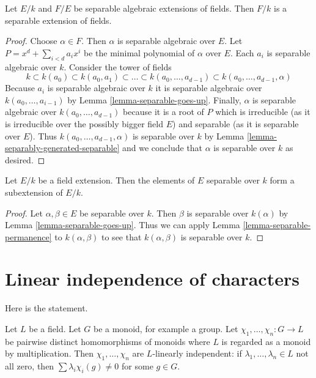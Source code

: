 \begin{lemma}
\label{lemma-separable-permanence}
Let $E/k$ and $F/E$ be separable algebraic extensions of fields. Then $F/k$
is a separable extension of fields.
\end{lemma}

\begin{proof}
Choose $\alpha \in F$. Then $\alpha$ is separable algebraic over $E$.
Let $P = x^d + \sum_{i < d} a_i x^i$ be the minimal polynomial of
$\alpha$ over $E$. Each $a_i$ is separable algebraic over $k$.
Consider the tower of fields
$$
k \subset k(a_0) \subset k(a_0, a_1) \subset \ldots \subset
k(a_0, \ldots, a_{d - 1}) \subset k(a_0, \ldots, a_{d - 1}, \alpha)
$$
Because $a_i$ is separable algebraic over $k$ it is separable algebraic
over $k(a_0, \ldots, a_{i - 1})$ by Lemma \ref{lemma-separable-goes-up}.
Finally, $\alpha$ is separable algebraic over $k(a_0, \ldots, a_{d - 1})$
because it is a root of $P$ which is irreducible
(as it is irreducible over the possibly bigger field $E$)
and separable (as it is separable over $E$).
Thus $k(a_0, \ldots, a_{d - 1}, \alpha)$ is separable over $k$
by Lemma \ref{lemma-separably-generated-separable}
and we conclude that $\alpha$ is separable over $k$ as desired.
\end{proof}

\begin{lemma}
\label{lemma-separable-elements}
Let $E/k$ be a field extension. Then the elements of $E$ separable
over $k$ form a subextension of $E/k$.
\end{lemma}

\begin{proof}
Let $\alpha, \beta \in E$ be separable over $k$. Then $\beta$ is separable
over $k(\alpha)$ by Lemma \ref{lemma-separable-goes-up}.
Thus we can apply Lemma \ref{lemma-separable-permanence} to $k(\alpha, \beta)$
to see that $k(\alpha, \beta)$ is separable over $k$.
\end{proof}





\section{Linear independence of characters}
\label{section-independence-characters}

\noindent
Here is the statement.

\begin{lemma}
\label{lemma-independence-characters}
Let $L$ be a field. Let $G$ be a monoid, for example a group. Let
$\chi_1, \ldots, \chi_n : G \to L$ be pairwise distinct
homomorphisms of monoids where $L$ is regarded as a monoid
by multiplication. Then $\chi_1, \ldots, \chi_n$
are $L$-linearly independent: if $\lambda_1, \ldots, \lambda_n \in L$
not all zero, then $\sum \lambda_i\chi_i(g) \not = 0$
for some $g \in G$.
\end{lemma}

